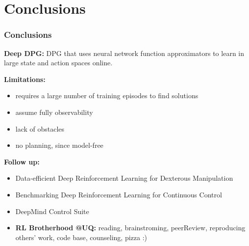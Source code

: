 \section{Conclusions}

\begin{frame}
\frametitle{Conclusions}
\textbf{Deep DPG:} DPG that uses neural network function approximators to
learn in large state and action spaces online.
\vspace{3mm}

\textbf{Limitations:}
\begin{itemize}
  \item requires a large number of training episodes to find solutions
  \item assume fully observability
  \item lack of obstacles
  \item no planning, since model-free
\end{itemize}
\vspace{3mm}

\textbf{Follow up:}
\begin{itemize}
\item {\footnotesize Data-efficient Deep Reinforcement Learning for Dexterous Manipulation}
\item Benchmarking Deep Reinforcement Learning for Continuous Control
\item DeepMind Control Suite
\item \textbf{RL Brotherhood @UQ:}
reading, brainstroming, peerReview,
reproducing others' work, code base, counseling, pizza :)
\end{itemize}

\end{frame}


